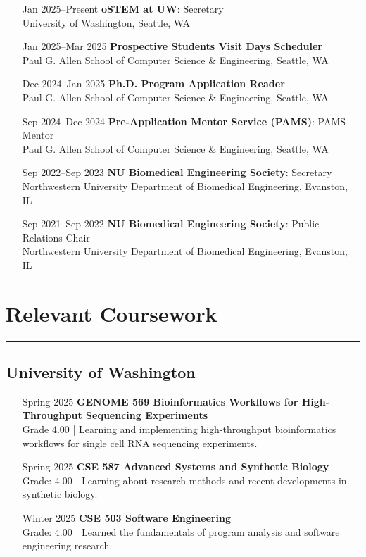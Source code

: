 \documentclass{article}
\begin{document}
\begin{itemize}[leftmargin=1.5in]
    \item[Jan 2025–Present] \textbf{oSTEM at UW}: Secretary\\
    University of Washington, Seattle, WA
    \item[Jan 2025–Mar 2025] \textbf{Prospective Students Visit Days Scheduler}\\
    Paul G. Allen School of Computer Science \& Engineering, Seattle, WA
    \item[Dec 2024–Jan 2025] \textbf{Ph.D. Program Application Reader}\\
    Paul G. Allen School of Computer Science \& Engineering, Seattle, WA
    \item[Sep 2024–Dec 2024] \textbf{Pre-Application Mentor Service (PAMS)}: PAMS Mentor\\
    Paul G. Allen School of Computer Science \& Engineering, Seattle, WA
    \item[Sep 2022–Sep 2023] \textbf{NU Biomedical Engineering Society}: Secretary\\
    Northwestern University Department of Biomedical Engineering, Evanston, IL
    \item[Sep 2021–Sep 2022] \textbf{NU Biomedical Engineering Society}: Public Relations Chair\\
    Northwestern University Department of Biomedical Engineering, Evanston, IL
\end{itemize}

\section*{Relevant Coursework}
\hrule
\vspace{10pt}

\subsection*{University of Washington}

\begin{itemize}[leftmargin=1.5in]
    \item[Spring 2025] \textbf{GENOME 569 Bioinformatics Workflows for High-Throughput Sequencing Experiments}\\
    Grade 4.00 | Learning and implementing high-throughput bioinformatics workflows for single cell RNA sequencing experiments.
    \item[Spring 2025] \textbf{CSE 587 Advanced Systems and Synthetic Biology}\\
    Grade: 4.00 | Learning about research methods and recent developments in synthetic biology.
    \item[Winter 2025] \textbf{CSE 503 Software Engineering}\\
    Grade: 4.00 | Learned the fundamentals of program analysis and software engineering research.
\end{itemize}
\end{document}
